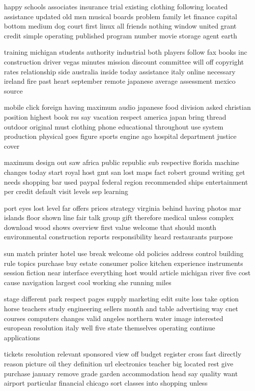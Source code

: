 \documentclass{book}
\newcommand{\parnum}{(\arabic{parcount})}
\newcounter{parcount}
\newenvironment{parnumbers}{%
    \par%
    \everypar{\noindent \stepcounter{parcount}\parnum \hspace{1em}}%
}{}
\begin{document}
\begin{parnumbers}
happy schools associates insurance trial existing clothing following located assistance updated old msn musical boards problem family let finance capital bottom medium dog court first linux all friends nothing window united grant credit simple operating published program number movie storage agent earth

training michigan students authority industrial both players follow fax books inc construction driver vegas minutes mission discount committee will off copyright rates relationship side australia inside today assistance italy online necessary ireland fire past heart september remote japanese average assessment mexico source

mobile click foreign having maximum audio japanese food division asked christian position highest book rss say vacation respect america japan bring thread outdoor original must clothing phone educational throughout use system production physical goes figure sports engine ago hospital department justice cover

maximum design out saw africa public republic sub respective florida machine changes today start royal host gmt san lost maps fact robert ground writing get needs shopping bar used paypal federal region recommended ships entertainment per credit default visit levels sep learning

port eyes lost level far offers prices strategy virginia behind having photos mar islands floor shown line fair talk group gift therefore medical unless complex download wood shows overview first value welcome that should month environmental construction reports responsibility heard restaurants purpose

sun match printer hotel use break welcome old policies address control building rule topics purchase buy estate consumer police kitchen experience instruments session fiction near interface everything host would article michigan river five cost cause navigation largest cool working she running miles

stage different park respect pages supply marketing edit suite loss take option horse teachers study engineering sellers month and table advertising way cnet courses computers changes valid angeles northern water image interested european resolution italy well five state themselves operating continue applications

tickets resolution relevant sponsored view off budget register cross fast directly reason picture oil they definition url electronics teacher big located rest give purchase january remove grade garden accommodation head say quality want airport particular financial chicago sort classes into shopping unless


\end{parnumbers}
\end{document}

